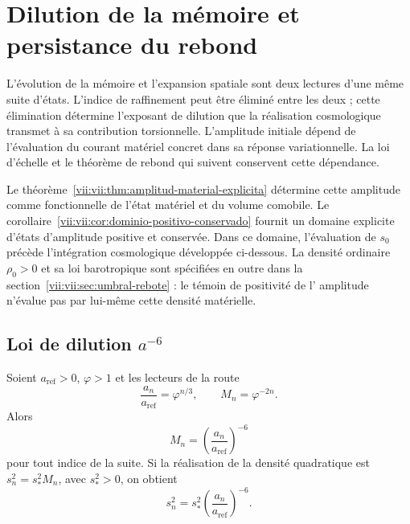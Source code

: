 
\section{Dilution de la mémoire et persistance du rebond}
\label{vii:vii:sec:dilucion-rebote}

L'évolution de la mémoire et l'expansion spatiale sont deux lectures d'une même suite d'états. L'indice de raffinement peut être éliminé entre les deux ; cette élimination détermine l'exposant de dilution que la réalisation cosmologique transmet à sa contribution torsionnelle. L'amplitude initiale dépend de l'évaluation du courant matériel concret dans sa réponse variationnelle. La loi d'échelle et le théorème de rebond qui suivent conservent cette dépendance.

Le théorème~\ref{vii:vii:thm:amplitud-material-explicita} détermine cette
amplitude comme fonctionnelle de l'état matériel et du volume comobile.
Le corollaire~\ref{vii:vii:cor:dominio-positivo-conservado} fournit
un domaine explicite d'états d'amplitude positive et conservée.
Dans ce domaine, l'évaluation de \(s_0\) précède l'intégration
cosmologique développée ci-dessous. La densité ordinaire
\(\rho_0>0\) et sa loi barotropique sont spécifiées en outre dans la
section~\ref{vii:vii:sec:umbral-rebote} : le témoin de positivité de l'
amplitude n'évalue pas par lui-même cette densité matérielle.

\subsection{Loi de dilution \(a^{-6}\)}
\label{vii:vii:sec:dilucion}

\begin{proposition}
\label{vii:vii:prop:dilucion}
Soient \(a_{\mathrm{ref}}>0\), \(\varphi>1\) et les lecteurs de la route
\[
 \frac{a_n}{a_{\mathrm{ref}}}=\varphi^{n/3},\qquad
 M_n=\varphi^{-2n}.
\]
Alors
\[
 M_n=\left(\frac{a_n}{a_{\mathrm{ref}}}\right)^{-6}
\]
pour tout indice de la suite. Si la réalisation de la densité
quadratique est \(s_n^2=s_*^2M_n\), avec \(s_*^2>0\), on obtient
\[
 s_n^2=s_*^2\left(\frac{a_n}{a_{\mathrm{ref}}}\right)^{-6}.
\]
\end{proposition}

